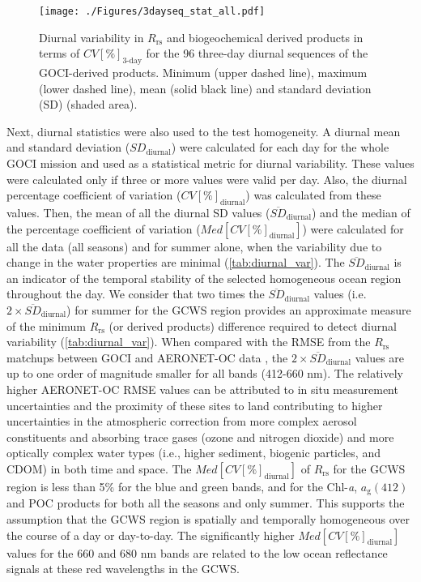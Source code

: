 \documentclass[remotesensing,article,submit,moreauthors,pdftex,10pt,a4paper]{Definitions/mdpi}
\begin{document}
\begin{figure}[htbp!]
\centering
\texttt{[image: ./Figures/3dayseq\_stat\_all.pdf]}
\caption{Diurnal variability in $R_\text{rs}$ and biogeochemical derived products in terms of $CV[\%]_\text{3-day}$ for the 96 three-day diurnal sequences of the GOCI-derived products. Minimum (upper dashed line), maximum (lower dashed line), mean (solid black line) and standard deviation (SD) (shaded area).\label{fig:3dayseq_stats} } 
\end{figure}
Next, diurnal statistics were also used to the test homogeneity. A diurnal mean and standard deviation ($SD_\text{diurnal}$) were calculated for each day for the whole GOCI mission and used as a statistical metric for diurnal variability. These values were calculated only if three or more values were valid per day. Also, the diurnal percentage coefficient of variation ($CV[\%]_\text{diurnal}$) was calculated from these values. Then, the mean of all the diurnal SD values ($\overline{SD}_\text{diurnal}$) and the median of the percentage coefficient of variation ($Med[CV[\%]_\text{diurnal}]$) were calculated for all the data (all seasons) and for summer alone, when the variability due to change in the water properties are minimal (\autoref{tab:diurnal_var}). The $\overline{SD}_\text{diurnal}$ is an indicator of the temporal stability of the selected homogeneous ocean region throughout the day. We consider that two times the $\overline{SD}_\text{diurnal}$ values (i.e. $2\times \overline{SD}_\text{diurnal}$) for summer for the GCWS region provides an approximate measure of the minimum $R_\text{rs}$ (or derived products) difference required to detect diurnal variability (\autoref{tab:diurnal_var}). When compared with the RMSE from the $R_\text{rs}$ matchups between GOCI and AERONET-OC data \cite{Concha_2018a}, the $2\times \overline{SD}_\text{diurnal}$ values are up to one order of magnitude smaller for all bands (412-660 nm). The relatively higher AERONET-OC RMSE values can be attributed to in situ measurement uncertainties and the proximity of these sites to land contributing to higher uncertainties in the atmospheric correction from more complex aerosol constituents and absorbing trace gases (ozone and nitrogen dioxide) and more optically complex water types (i.e., higher sediment, biogenic particles, and CDOM) in both time and space. The $Med[CV[\%]_\text{diurnal}]$ of $R_\text{rs}$ for the GCWS region is less than 5\% for the blue and green bands, and for the Chl-{\it a}, $a_\text{g}(412)$ and POC products for both all the seasons and only summer. This supports the assumption that the GCWS region is spatially and temporally homogeneous over the course of a day or day-to-day. The significantly higher $Med[CV[\%]_\text{diurnal}]$ values for the 660 and 680 nm bands are related to the low ocean reflectance signals at these red wavelengths in the GCWS. 
\end{document}
